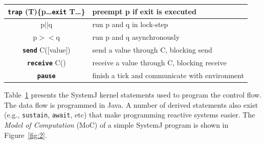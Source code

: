 \begin{table}[tb]
\begin{minipage}{8cm}
\begin{scriptsize}
\begin{tabular}{|c|p{80pt}|}
     \textbf{\texttt{trap}} (T)\{p\ldots \textbf{\texttt{exit}} T\ldots\} & preempt p if exit is executed\\                         
     \hline                                                                                     
     p\textbf{\texttt{$||$}}q & run p and q in lock-step\\                                                        
     \hline                                                                                     
     p$><$q & run p and q asynchronously\\                                                      
     \hline                                                                                     
     \textbf{\texttt{send}} C([value]) & send a value through C, blocking
     send\\                                                 
     \hline                                                                                     
     \textbf{\texttt{receive}} C() & receive a value through C, blocking
     receive\\
     \hline                                                                                     
     \textbf{\texttt{pause}} & finish a tick and communicate
     with environment\\
     \hline                                                                                     
   \end{tabular}
  \end{scriptsize}
 \end{minipage}
 \label{tab:1}
\end{table}

Table~\ref{tab:1} presents the SystemJ kernel statements used to program
the control flow. The data flow is programmed in Java. A number of
derived statements also exist (e.g., \texttt{sustain}, \texttt{await},
etc) that make programming reactive systems easier. The \textit{Model of
  Computation} (MoC) of a simple SystemJ program is shown in
Figure~\ref{fig:2}.


